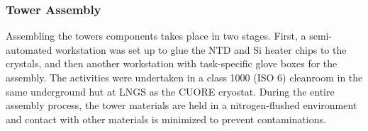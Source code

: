 \subsubsection{Tower Assembly}

Assembling the towers components takes place in two stages.
First, a semi-automated workstation was set up to glue the NTD and Si heater chips to the crystals, and then another workstation with task-specific glove boxes for the assembly.
The activities were undertaken in a class 1000 (ISO 6) cleanroom in the same underground hut at LNGS as the CUORE cryostat.
During the entire assembly process, the tower materials are held in a nitrogen-flushed environment and contact with other materials is minimized to prevent contaminations.


